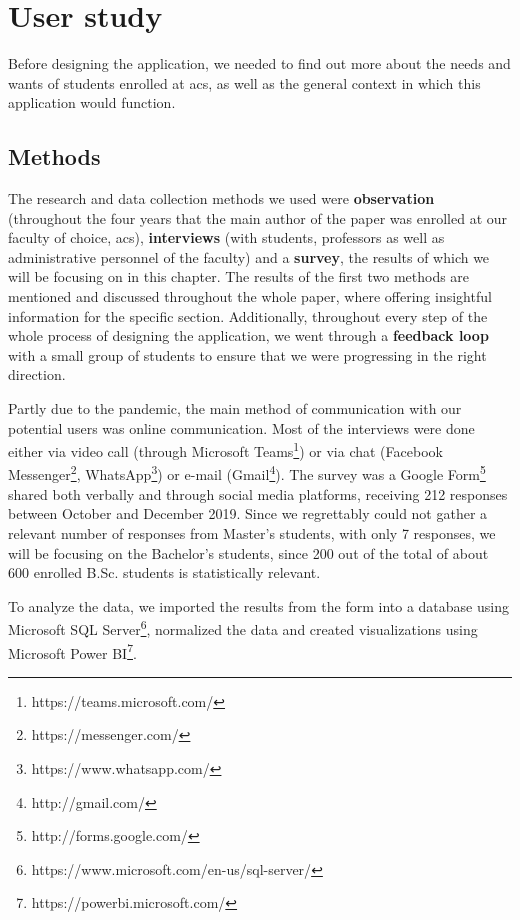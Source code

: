 \chapter{User study} \label{chapter3}

Before designing the application, we needed to find out more about the needs and wants of students enrolled at \acrshort{acs}, as well as the general context in which this application would function.

\section{Methods} \label{3:methods}

The research and data collection methods we used were \textbf{observation} (throughout the four years that the main author of the paper was enrolled at our faculty of choice, \acrshort{acs}), \textbf{interviews} (with students, professors as well as administrative personnel of the faculty) and a \textbf{survey}, the results of which we will be focusing on in this chapter.  The results of the first two methods are mentioned and discussed throughout the whole paper, where offering insightful information for the specific section. Additionally, throughout every step of the whole process of designing the application, we went through a \textbf{feedback loop} with a small group of students to ensure that we were progressing in the right direction.

Partly due to the pandemic, the main method of communication with our potential users was online communication. Most of the interviews were done either via video call (through Microsoft Teams\footnote{https://teams.microsoft.com/}) or via chat (Facebook Messenger\footnote{https://messenger.com/}, WhatsApp\footnote{https://www.whatsapp.com/}) or e-mail (Gmail\footnote{http://gmail.com/}). The survey was a Google Form\footnote{http://forms.google.com/} shared both verbally and through social media platforms, receiving 212 responses between October and December 2019. Since we regrettably could not gather a relevant number of responses from Master's students, with only 7 responses, we will be focusing on the Bachelor's students, since 200 out of the total of about 600 enrolled B.Sc. students is statistically relevant.

To analyze the data, we imported the results from the form into a database using Microsoft SQL Server\footnote{https://www.microsoft.com/en-us/sql-server/}, normalized the data and created visualizations using Microsoft Power BI\footnote{https://powerbi.microsoft.com/}.

